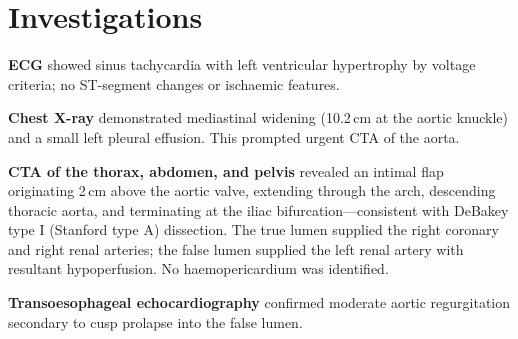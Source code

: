 \section{Investigations}

\textbf{ECG} showed sinus tachycardia with left ventricular hypertrophy by voltage criteria;
no ST-segment changes or ischaemic features.

\textbf{Chest X-ray} demonstrated mediastinal widening (10.2\,cm at the aortic knuckle) and
a small left pleural effusion. This prompted urgent CTA of the aorta.

\textbf{CTA of the thorax, abdomen, and pelvis} revealed an intimal flap originating 2\,cm
above the aortic valve, extending through the arch, descending thoracic aorta, and terminating
at the iliac bifurcation—consistent with DeBakey type I (Stanford type A) dissection.
The true lumen supplied the right coronary and right renal arteries; the false lumen supplied
the left renal artery with resultant hypoperfusion. No haemopericardium was identified.

\textbf{Transoesophageal echocardiography} confirmed moderate aortic regurgitation secondary
to cusp prolapse into the false lumen.

